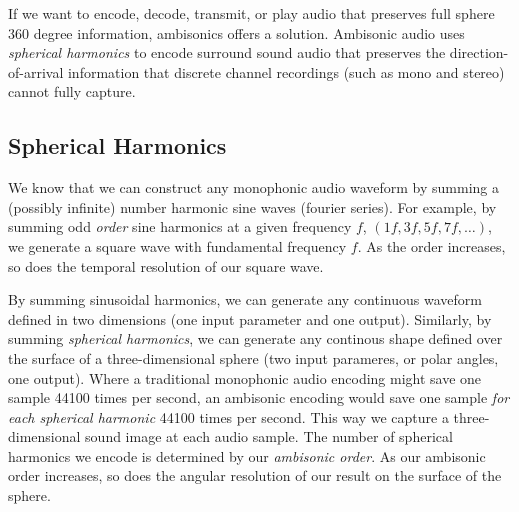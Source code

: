 If we want to encode, decode, transmit, or play audio that preserves
full sphere 360 degree information, ambisonics offers a solution.
Ambisonic audio uses \textit{spherical harmonics} to encode surround
sound audio that preserves the direction-of-arrival information that
discrete channel recordings (such as mono and stereo) cannot fully
capture.

\subsection{Spherical Harmonics}
\label{sec:spherical-harmonics}
We know that we can construct any monophonic audio waveform by summing
a (possibly infinite) number harmonic sine waves (fourier
series).
For example, by summing odd \textit{order} sine harmonics at a given
frequency $f$, $(1f, 3f, 5f, 7f, \ldots )$, we generate a square wave
with fundamental frequency $f$. As the order increases, so does the
temporal resolution of our square wave.

By summing sinusoidal harmonics, we can generate any continuous
waveform defined in two dimensions (one input parameter and one
output). Similarly, by summing \emph{spherical harmonics}, we can
generate any continous shape defined over the surface of a
three-dimensional sphere (two input parameres, or polar angles, one
output). Where a traditional monophonic audio encoding might save one
sample 44100 times per second, an ambisonic encoding would save one
sample \emph{for each spherical harmonic} 44100 times per second. This
way we capture a three-dimensional sound image at each audio sample.
The number of spherical harmonics we encode is determined by our
\textit{ambisonic order}. As our ambisonic order increases, so does
the angular resolution of our result on the surface of the sphere.

